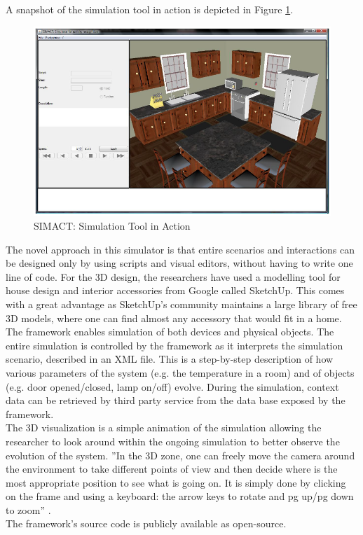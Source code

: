 A snapshot of the simulation tool in action is depicted in Figure \ref{fig:simact_simulation_tool}.

\begin{figure}[H]
	\centering
	\includegraphics[width=\linewidth]{gfx/Chapter2/simact_simulation_tool}
	\caption{SIMACT: Simulation Tool in Action}
	\label{fig:simact_simulation_tool}
\end{figure}

The novel approach in this simulator is that entire scenarios and interactions can be designed only by using scripts and visual editors, without having to write one line of code. For the 3D design, the researchers have used a modelling tool for house design and interior accessories from Google called SketchUp. This comes with a great advantage as SketchUp's community maintains a large library of free 3D models, where one can find almost any accessory that would fit in a home.\\

The framework enables simulation of both devices and physical objects. The entire simulation is controlled by the framework as it interprets the simulation scenario, described in an XML file. This is a step-by-step description of how various parameters of the system (e.g. the temperature in a room) and of objects (e.g. door opened/closed, lamp on/off) evolve. During the simulation, context data can be retrieved by third party service from the data base exposed by the framework.\\

The 3D visualization is a simple animation of the simulation allowing the researcher to look around within the ongoing simulation to better observe the evolution of the system. ''In the 3D zone, one can freely move the camera around the environment to take different points of view and then decide where is the most appropriate position to see what is going on. It is simply done by clicking on the frame and using a keyboard: the arrow keys to rotate and pg up/pg down to zoom'' \cite{bouchard2012simact}.\\

The framework's source code is publicly available as open-source.
